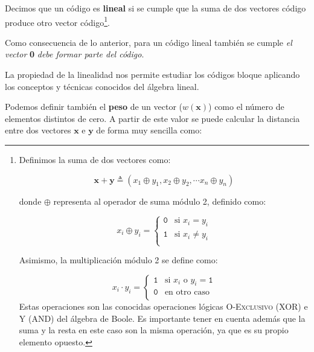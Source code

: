 \documentclass[es,apuntes]{uah}
\begin{document}
Decimos que un código es {\bf lineal} si se cumple que la suma de dos vectores código produce otro vector código\footnote{Definimos la suma de dos vectores como: 

\begin{displaymath}
	\mathbf{x} + \mathbf{y} \triangleq (x_1 \oplus y_1, x_2 \oplus y_2, \cdots x_n \oplus y_n )
\end{displaymath}

donde $\oplus$ representa al operador de suma módulo 2, definido como:

\begin{displaymath}
	x_i \oplus y_i = \left \{ 
	\begin{array}{cl} 
		\mathtt{0} & \mathrm{si}\,\, x_i = y_i\\
 		\mathtt{1} & \mathrm{si} \,\, x_i \neq y_i \\ 
 	\end{array} 	\right.
\end{displaymath}

Asimismo, la multiplicación módulo 2 se define como:

\begin{displaymath}
	x_i \cdot y_i = \left \{ \begin{array}{cl}
 		\mathtt{1} & \mathrm{si} \,\, x_i \,\, \mathrm{o} \,\, y_i = \mathtt{1}\\
 		\mathtt{0} & \mathrm{en\,\, otro\,\, caso}\\	
 \end{array} \right.
\end{displaymath}
Estas operaciones son las conocidas operaciones lógicas \textsc{O-Exclusivo (XOR)} e \textsc{Y (AND)} del álgebra de Boole. 
Es importante tener en cuenta además que la suma y la resta en este caso son la misma operación, ya que  es su propio elemento opuesto. 
}. 

Como consecuencia de lo anterior, para un código lineal también se cumple \textit{el vector} \textbf{0} \textit{debe formar parte del código}.

La propiedad de la linealidad nos permite estudiar los códigos bloque aplicando los conceptos y técnicas conocidos del álgebra lineal. 

Podemos definir también el {\bf peso} de un vector ($w(\mathbf{x})$) como el número de elementos distintos de cero. A partir de este valor se puede calcular la distancia entre dos vectores $\mathbf{x}$ e $\mathbf{y}$ de forma muy sencilla como:
\end{document}
